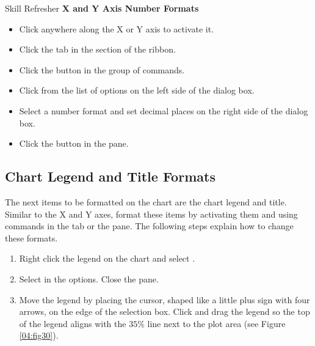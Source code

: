 \begin{center}
	\begin{sklbox}{Skill Refresher}
		\textbf{X and Y Axis Number Formats}
		\\
		\begin{itemize}
			\setlength{\itemsep}{0pt}
			\setlength{\parskip}{0pt}
			\setlength{\parsep}{0pt}

			\item Click anywhere along the X or Y axis to activate it.
			\item Click the  tab in the  section of the ribbon.
			\item Click the  button in the  group of commands.
			\item Click  from the list of options on the left side of the  dialog box.
			\item Select a number format and set decimal places on the right side of the  dialog box.
			\item Click the  button in the  pane.
			
		\end{itemize}
	\end{sklbox}
\end{center}

\subsection{Chart Legend and Title Formats}

The next items to be formatted on the  chart are the chart legend and title. Similar to the X and Y axes, format these items by activating them and using commands in the  tab or the  pane. The following steps explain how to change these formats.

\begin{enumerate}
	\item Right click the legend on the  chart and select .
	\item Select  in the  options. Close the  pane.
	\item Move the legend by placing the cursor, shaped like a little plus sign with four arrows, on the edge of the selection box. Click and drag the legend so the top of the legend aligns with the $ 35\% $ line next to the plot area (see Figure \ref{04:fig30}).
\end{enumerate}

